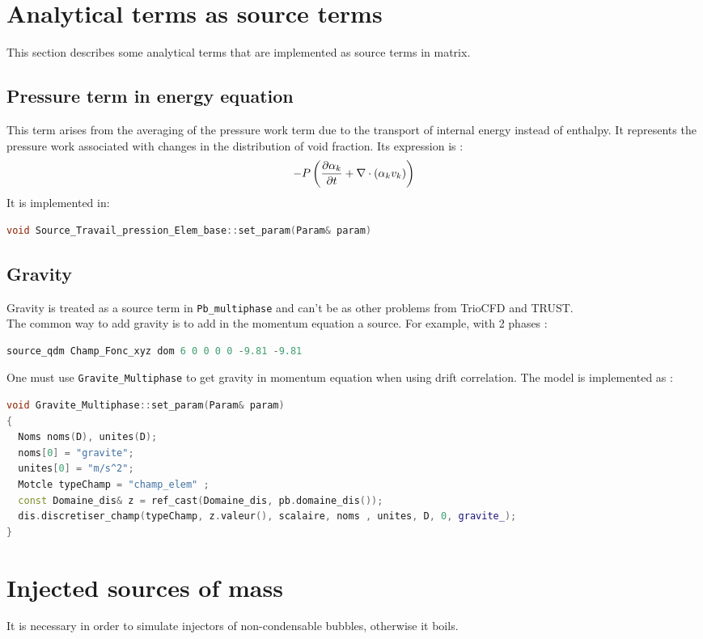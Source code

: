 \section{Analytical terms as source terms}\label{sec:analytical}
This section describes some analytical terms that are implemented as source terms in matrix.
\subsection{Pressure term in energy equation}
This term arises from the averaging of the pressure work term due to the transport of internal energy instead of enthalpy. It represents the pressure work associated with changes in the distribution of void fraction. Its expression is :
\begin{equation}
    -P\left( \frac{\partial \alpha_k}{\partial t}+\nabla \cdot (\alpha_k v_k) \right)
\end{equation}
It is implemented in: 
\begin{lstlisting}[language=c++]
void Source_Travail_pression_Elem_base::set_param(Param& param)
\end{lstlisting}
\subsection{Gravity}
Gravity is treated as a source term in \texttt{Pb_multiphase} and can't be as other problems from TrioCFD and TRUST. \\
The common way to add gravity is to add in the momentum equation a source. For example, with 2 phases :
\begin{lstlisting}[language=c++]
source_qdm Champ_Fonc_xyz dom 6 0 0 0 0 -9.81 -9.81
\end{lstlisting}
One must use \texttt{Gravite_Multiphase} to get gravity in momentum equation when using drift correlation.
The model is implemented as :
\begin{lstlisting}[language=c++]
void Gravite_Multiphase::set_param(Param& param)
{
  Noms noms(D), unites(D);
  noms[0] = "gravite";
  unites[0] = "m/s^2";
  Motcle typeChamp = "champ_elem" ;
  const Domaine_dis& z = ref_cast(Domaine_dis, pb.domaine_dis());
  dis.discretiser_champ(typeChamp, z.valeur(), scalaire, noms , unites, D, 0, gravite_);
}
\end{lstlisting}

\section{Injected sources of mass}\label{sec:injection}
It is necessary in order to simulate injectors of non-condensable bubbles, otherwise it boils.
